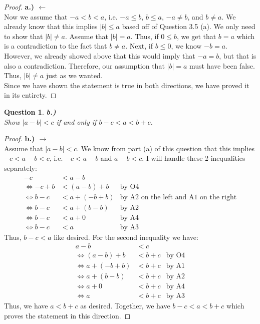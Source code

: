 \documentclass[10pt,a4paper]{article}
\newtheorem*{question*}{Question}
\theoremstyle{definition}
\begin{document}
\begin{proof}{\textbf{a.) $\leftarrow$}}
\\Now we assume that $-a<b<a$, i.e. $-a \leq b$, $b\leq a$, $-a \neq b$, and $b\neq a$. We already know that this implies $|b| \leq a$ based off of Question 3.5 (a). We only need to show that $|b| \neq a$. Assume that $|b| = a$. Thus, if $0 \leq b$, we get that $b = a$ which is a contradiction to the fact that $b \neq a$. Next, if $b \leq 0$, we know $-b = a$. However, we already showed above that this would imply that $-a = b$, but that is also a contradiction. Therefore, our assumption that $|b| = a$ must have been false. Thus, $|b| \neq a$ just as we wanted. 
\\Since we have shown the statement is true in both directions, we have proved it in its entirety. 
\end{proof}

\begin{question*}{\textbf{b.)}}
\\Show $|a-b| < c$ if and only if $b-c < a < b + c$.
\end{question*}

\begin{proof}{\textbf{b.) $\rightarrow$}}
\\Assume that $|a-b| < c$. We know from part (a) of this question that this implies $-c < a-b < c$, i.e. $-c < a-b$ and $a-b < c$. I will handle these 2 inequalities separately:
\begin{align*}
-c &< a-b\\
\iff -c + b &< (a-b) + b &\text{by O4}\\
\iff b - c &< a + (-b + b) &\text{by A2 on the left and A1 on the right}\\
\iff b - c &< a + (b - b) &\text{by A2}\\
\iff b - c &< a + 0 &\text{by A4}\\
\iff b - c &< a &\text{by A3}
\end{align*}
Thus, $b - c < a$ like desired. For the second inequality we have:
\begin{align*}
a - b &< c\\
\iff (a - b) + b &< b + c &\text{by O4}\\
\iff a + (-b + b) &< b + c &\text{by A1}\\
\iff a + (b - b) &< b + c &\text{by A2}\\
\iff a + 0 &< b + c &\text{by A4}\\
\iff a &< b + c &\text{by A3}
\end{align*}
Thus, we have $a < b + c$ as desired. Together, we have $b - c < a < b + c$ which proves the statement in this direction. 
\end{proof}
\end{document}
